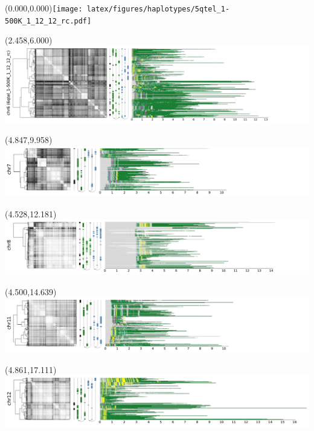 \documentclass{article}
\begin{document}
\begin{textblock}{13}(0.000,0.000)\texttt{[image: latex/figures/haplotypes/5qtel\_1-500K\_1\_12\_12\_rc.pdf]}\end{textblock}
\begin{textblock}{13}(2.458,6.000)\includegraphics{latex/figures/haplotypes/6qtel_1-500K_1_12_12_rc.pdf}\end{textblock}
\begin{textblock}{13}(4.847,9.958)\includegraphics{latex/figures/haplotypes/chr7.pdf}\end{textblock}
\begin{textblock}{13}(4.528,12.181)\includegraphics{latex/figures/haplotypes/chr8.pdf}\end{textblock}
\begin{textblock}{13}(4.500,14.639)\includegraphics{latex/figures/haplotypes/chr11.pdf}\end{textblock}
\begin{textblock}{13}(4.861,17.111)\includegraphics{latex/figures/haplotypes/chr12.pdf}\end{textblock}
\end{document}
